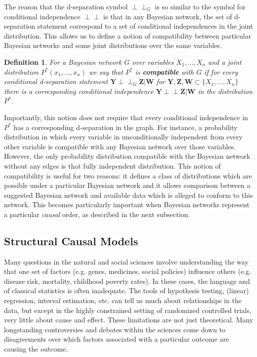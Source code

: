 \documentclass[12pt,twoside]{reedthesis}
\newtheorem{definition}{Definition}[section]
\theoremstyle{definition}
\newcommand{\dsep}{\perp \!\!\!\perp}
\begin{document}
The reason that the d-separation symbol $\dsep_G$ is so similar to the symbol for conditional independence $\dsep$ is that in any Bayesian network, the set of d-separation statement correspond to a set of conditional independences in the joint distribution. This allows us to define a notion of compatibility between particular Bayesian networks and some  joint distributions over the same variables.

\begin{definition}
For a Bayesian network $G$ over variables $X_1, ..., X_n$ and a joint distribution $P^*(x_1, ... , x_n)$ we say that $P^*$ is \emph{\textbf{compatible}} with $G$ if for every conditional d-separation statement $\mathbf{Y} \dsep_G \mathbf{Z}  | \mathbf{W}$ for $\mathbf{Y}, \mathbf{Z}, \mathbf{W} \subset \{X_1,...,X_n\}$ there is a corresponding conditional independence $\mathbf{Y} \dsep \mathbf{Z}  | \mathbf{W}$ in the distribution $P^*$.
\end{definition}

Importantly, this notion does not require that every conditional independence in $P^*$ has a corresponding d-separation in the graph. For instance, a probability distribution in which every variable in unconditionally independent from every other variable is compatible with any Bayesian network over those variables. However, the only probability distribution compatible with the Bayesian network without any edges is that fully independent distribution.  This notion of compatibility is useful for two reasons: it defines a class of distributions which are possible under a particular Bayesian network and it allows comparison between a suggested Bayesian network and available data which is alleged to conform to this network. This becomes particularly important when Bayesian networks represent a particular \emph{causal} order, as described in the next subsection.


\subsection{Structural Causal Models}
Many questions in the natural and social sciences involve understanding the way that one set of factors (e.g. genes, medicines, social policies) influence others (e.g. disease risk, mortality, childhood poverty rates). In these cases, the language and  of classical statistics is often inadequate. The tools of hypothesis testing, (linear) regression, interval estimation, etc. can tell us much about relationships in the data, but except in the highly constrained setting of randomized controlled trials, very little about cause and effect. These limitations are not just theoretical. Many longstanding controversies and debates within the sciences come down to disagreements over which factors associated with a particular outcome are causing the outcome. 
\end{document}
